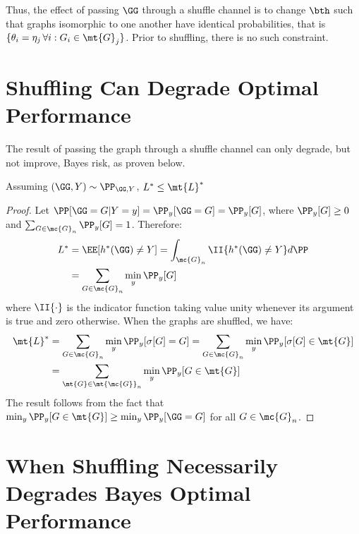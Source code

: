 \documentclass[10pt,journal,cspaper,compsoc]{IEEEtran}
\begin{document}
Thus, the effect of passing $\GG$ through a shuffle channel is to change $\bth$ such that graphs isomorphic to one another have identical probabilities, that is $\{\theta_i=\eta_j \, \forall i : G_i \in \mt{G}_j\}$.  Prior to shuffling, there is no such constraint.



\section{Shuffling Can Degrade Optimal Performance} %
\label{sub:pre_and_post_shuffled_bayes_optimal_performance}

The result of passing the graph through a shuffle channel can only degrade, but not improve, Bayes risk, as proven below.


\begin{thm}
Assuming $(\GG,Y) \sim \PP_{\GG,Y}$, 	$L^* \leq \mt{L}^*$
\end{thm}

\begin{proof}
Let $\PP[\GG=G | Y=y]=\PP_y[\GG=G]=\PP_y[G]$, where $\PP_y[G]\geq 0$ and $\sum_{G \in \mc{G}_n} \PP_y[G]=1$. Therefore:
\begin{align}
	L^*&=\EE[h^*(\GG)\neq Y]= \int_{\mc{G}_n}\II\{h^*(\GG) \neq Y\} d\PP \nonumber
	\\&=\sum_{G \in \mc{G}_n} \min_y \PP_y[G]
\end{align}
where  $\II\{\cdot\}$ is the indicator function taking value unity whenever its argument is true and zero otherwise.  When the graphs are shuffled, we have:
\begin{align}
	\mt{L}^*&=\sum_{G \in {\mc{G}}_n} \min_y \PP_y[\sigma[G] = G]
	=\sum_{G \in {\mc{G}}_n} \min_y \PP_y[\sigma[G]  \in \mt{G}]
	\nonumber \\&=\sum_{\mt{G} \in \mt{\mc{G}}_n} \min_y \PP_y[G \in \mt{G}]
\end{align}
The result follows from the fact that $\min_y \PP_y[G \in \mt{G}] \geq \min_y \PP_y[\GG=G]$ for all $G \in \mc{G}_n$.
\end{proof}

\section{When Shuffling Necessarily Degrades Bayes Optimal Performance} %
\label{sub:labels_contain_information}
\end{document}
